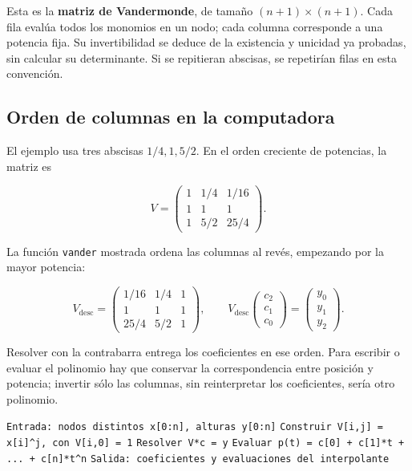 \documentclass[12pt,a4paper]{article}
\begin{document}
Esta es la \textbf{matriz de Vandermonde}, de tamaño $(n+1)\times(n+1)$. Cada fila evalúa todos los monomios en un nodo; cada columna corresponde a una potencia fija. Su invertibilidad se deduce de la existencia y unicidad ya probadas, sin calcular su determinante. Si se repitieran abscisas, se repetirían filas en esta convención.

\subsection{Orden de columnas en la computadora}

El ejemplo usa tres abscisas $1/4,1,5/2$. En el orden creciente de potencias, la matriz es

\[
V=\begin{pmatrix}
1&1/4&1/16\\
1&1&1\\
1&5/2&25/4
\end{pmatrix}.
\]

La función \texttt{vander} mostrada ordena las columnas al revés, empezando por la mayor potencia:

\[
V_{\mathrm{desc}}=\begin{pmatrix}
1/16&1/4&1\\
1&1&1\\
25/4&5/2&1
\end{pmatrix},\qquad
V_{\mathrm{desc}}\begin{pmatrix}c_2\\c_1\\c_0\end{pmatrix}
=\begin{pmatrix}y_0\\y_1\\y_2\end{pmatrix}.
\]

Resolver con la contrabarra entrega los coeficientes en ese orden. Para escribir o evaluar el polinomio hay que conservar la correspondencia entre posición y potencia; invertir sólo las columnas, sin reinterpretar los coeficientes, sería otro polinomio.

\begin{algorithm}[H]
\small\DontPrintSemicolon
\hspace*{0.0em}\texttt{Entrada: nodos distintos x[0:n], alturas y[0:n]}\;
\hspace*{0.0em}\texttt{Construir V[i,j] = x[i]\textasciicircum{}j, con V[i,0] = 1}\;
\hspace*{0.0em}\texttt{Resolver V*c = y}\;
\hspace*{0.0em}\texttt{Evaluar p(t) = c[0] + c[1]*t + ... + c[n]*t\textasciicircum{}n}\;
\hspace*{0.0em}\texttt{Salida: coeficientes y evaluaciones del interpolante}\;
\end{algorithm}
\end{document}
